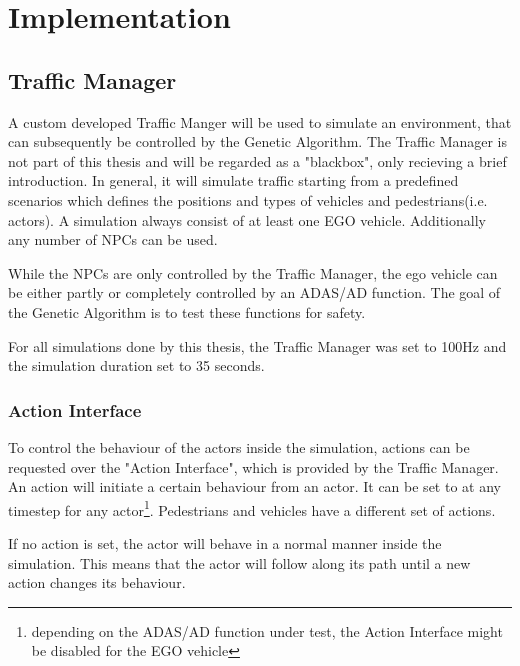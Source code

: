 \chapter{Implementation}

\section{Traffic Manager}
A custom developed Traffic Manger will be used to simulate an environment, that can subsequently be controlled by the Genetic Algorithm. The Traffic Manager is not part of this thesis and will be regarded as a "blackbox", only recieving a brief introduction.
In general, it will simulate traffic starting from a predefined scenarios which defines the positions and types of vehicles and pedestrians(i.e. actors). 
A simulation always consist of at least one EGO vehicle. Additionally any number of NPCs can be used.

While the NPCs are only controlled by the Traffic Manager, the ego vehicle can be either partly or completely controlled by an ADAS/AD function. The goal of the Genetic Algorithm is to test these functions for safety.

For all simulations done by this thesis, the Traffic Manager was set to 100Hz and the simulation duration set to 35 seconds.

\subsection{Action Interface}
\label{implementation:action_interface}
To control the behaviour of the actors inside the simulation, actions can be requested over the "Action Interface", which is provided by the Traffic Manager. An action will initiate a certain behaviour from an actor. It can be set to at any timestep for any actor\footnote{depending on the ADAS/AD function under test, the Action Interface might be disabled for the EGO vehicle}. Pedestrians and vehicles have a different set of actions.


If no action is set, the actor will behave in a normal manner inside the simulation. This means that the actor will follow along its path until a new action changes its behaviour.

